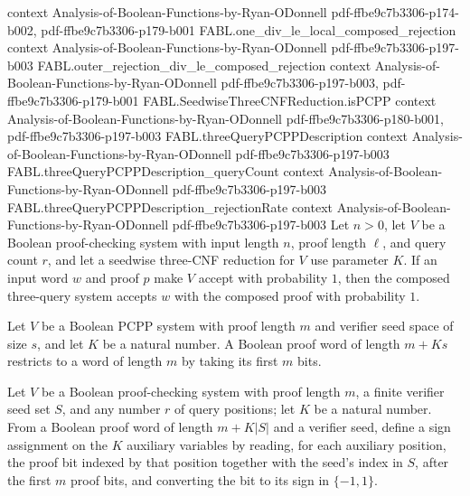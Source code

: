 \begin{theorem}
  {context}
  {Analysis-of-Boolean-Functions-by-Ryan-ODonnell}
  {pdf-ffbe9c7b3306-p174-b002,
    pdf-ffbe9c7b3306-p179-b001}
\proofstep
  {FABL.one_div_le_local_composed_rejection}
  {context}
  {Analysis-of-Boolean-Functions-by-Ryan-ODonnell}
  {pdf-ffbe9c7b3306-p197-b003}
\proofstep
  {FABL.outer_rejection_div_le_composed_rejection}
  {context}
  {Analysis-of-Boolean-Functions-by-Ryan-ODonnell}
  {pdf-ffbe9c7b3306-p197-b003,
    pdf-ffbe9c7b3306-p179-b001}
\proofstep
  {FABL.SeedwiseThreeCNFReduction.isPCPP}
  {context}
  {Analysis-of-Boolean-Functions-by-Ryan-ODonnell}
  {pdf-ffbe9c7b3306-p180-b001,
    pdf-ffbe9c7b3306-p197-b003}
\proofstep
  {FABL.threeQueryPCPPDescription}
  {context}
  {Analysis-of-Boolean-Functions-by-Ryan-ODonnell}
  {pdf-ffbe9c7b3306-p197-b003}
\proofstep
  {FABL.threeQueryPCPPDescription_queryCount}
  {context}
  {Analysis-of-Boolean-Functions-by-Ryan-ODonnell}
  {pdf-ffbe9c7b3306-p197-b003}
\proofstep
  {FABL.threeQueryPCPPDescription_rejectionRate}
  {context}
  {Analysis-of-Boolean-Functions-by-Ryan-ODonnell}
  {pdf-ffbe9c7b3306-p197-b003}
Let $n>0$, let $V$ be a Boolean proof-checking system with input length $n$, proof
length $\ell$, and query count $r$, and let a seedwise three-CNF reduction for $V$ use
parameter $K$. If an input word $w$ and proof $p$ make $V$ accept with probability $1$,
then the composed three-query system accepts $w$ with the composed proof with
probability $1$.
\end{theorem}

\begin{definition}
\label{FABL.restrictOuterProof}
\leanok
{}
Let $V$ be a Boolean PCPP system with proof length $m$ and verifier seed space of size
$s$, and let $K$ be a natural number. A Boolean proof word of length $m+Ks$ restricts to
a word of length $m$ by taking its first $m$ bits.
\end{definition}

\begin{definition}
\label{FABL.extractLocalAuxiliaries}
\leanok
{}
Let $V$ be a Boolean proof-checking system with proof length $m$, a finite verifier seed
set $S$, and any number $r$ of query positions; let $K$ be a natural number. From a
Boolean proof word of length $m+K|S|$ and a verifier seed, define a sign assignment on
the $K$ auxiliary variables by reading, for each auxiliary position, the proof bit
indexed by that position together with the seed’s index in $S$, after the first $m$
proof bits, and converting the bit to its sign in $\{ -1,1\}$.
\end{definition}

